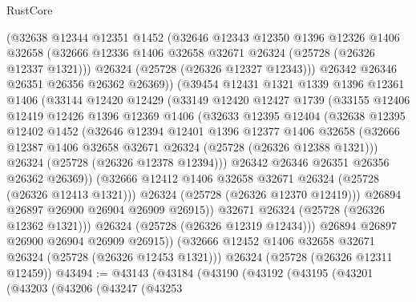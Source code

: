 \begin{lexlean}{RustCore}
\begin{coremodule}
            (@32638
              @12344
              @12351
              @1452
              (@32646
                @12343
                @12350
                @1396
                @12326
                @1406
                @32658
                (@32666 @12336 @1406 @32658 @32671 @26324 (@25728 (@26326 @12337 @1321)))
                @26324
                (@25728 (@26326 @12327 @12343)))
              @26342
              @26346
              @26351
              @26356
              @26362
              @26369))
          (@39454
            @12431
            @1321
            @1339
            @1396
            @12361
            @1406
            (@33144
              @12420
              @12429
              (@33149
                @12420
                @12427
                @1739
                (@33155
                  @12406
                  @12419
                  @12426
                  @1396
                  @12369
                  @1406
                  (@32633
                    @12395
                    @12404
                    (@32638
                      @12395
                      @12402
                      @1452
                      (@32646
                        @12394
                        @12401
                        @1396
                        @12377
                        @1406
                        @32658
                        (@32666 @12387 @1406 @32658 @32671 @26324 (@25728 (@26326 @12388 @1321)))
                        @26324
                        (@25728 (@26326 @12378 @12394)))
                      @26342
                      @26346
                      @26351
                      @26356
                      @26362
                      @26369))
                  (@32666 @12412 @1406 @32658 @32671 @26324 (@25728 (@26326 @12413 @1321)))
                  @26324
                  (@25728 (@26326 @12370 @12419)))
                @26894
                @26897
                @26900
                @26904
                @26909
                @26915))
            @32671
            @26324
            (@25728 (@26326 @12362 @1321)))
          @26324
          (@25728 (@26326 @12319 @12434)))
        @26894
        @26897
        @26900
        @26904
        @26909
        @26915))
    (@32666 @12452 @1406 @32658 @32671 @26324 (@25728 (@26326 @12453 @1321)))
    @26324
    (@25728 (@26326 @12311 @12459))
@43494 := @43143
    (@43184
      (@43190
        (@43192
          (@43195
            (@43201
              (@43203
                (@43206
                  (@43247
                    (@43253

\end{coremodule}
\end{lexlean}
